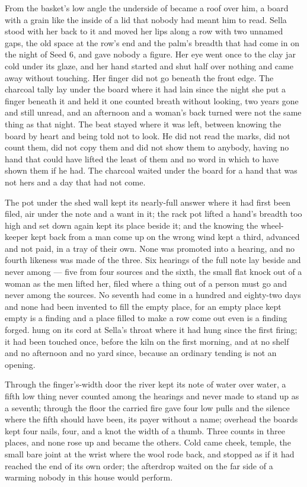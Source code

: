 \scenebreak

From the basket's low angle the underside of  became a roof over him, a board with a grain like the inside of a lid that nobody had meant him to read. Sella stood with her back to it and moved her lips along a row with two unnamed gaps, the old space at the row's end and the palm's breadth that had come in on the night of Seed 6, and gave nobody a figure. Her eye went once to the clay jar cold under its glaze, and her hand started and shut half over nothing and came away without touching. Her finger did not go beneath the front edge. The charcoal tally lay under the board where it had lain since the night she put a finger beneath it and held it one counted breath without looking, two years gone and still unread, and an afternoon and a woman's back turned were not the same thing as that night. The beat stayed where it was left, between knowing the board by heart and being told not to look. He did not read the marks, did not count them, did not copy them and did not show them to anybody, having no hand that could have lifted the least of them and no word in which to have shown them if he had. The charcoal waited under the board for a hand that was not hers and a day that had not come.

The pot under the shed wall kept its nearly-full answer where it had first been filed, air under the note and a want in it; the rack pot lifted a hand's breadth too high and set down again kept its place beside it; and the knowing the wheel-keeper kept back from a man come up on the wrong wind kept a third, advanced and not paid, in a tray of their own. None was promoted into a hearing, and no fourth likeness was made of the three. Six hearings of the full note lay beside and never among --- five from four sources and the sixth, the small flat knock out of a woman as the men lifted her, filed where a thing out of a person must go and never among the sources. No seventh had come in a hundred and eighty-two days and none had been invented to fill the empty place, for an empty place kept empty is a finding and a place filled to make a row come out even is a finding forged.  hung on its cord at Sella's throat where it had hung since the first firing; it had been touched once, before the kiln on the first morning, and at no shelf and no afternoon and no yard since, because an ordinary tending is not an opening.

Through the finger's-width door the river kept its note of water over water, a fifth low thing never counted among the hearings and never made to stand up as a seventh; through the floor the carried fire gave four low pulls and the silence where the fifth should have been, its payer without a name; overhead the boards kept four nails, four, and a knot the width of a thumb. Three counts in three places, and none rose up and became the others. Cold came cheek, temple, the small bare joint at the wrist where the wool rode back, and stopped as if it had reached the end of its own order; the afterdrop waited on the far side of a warming nobody in this house would perform.

